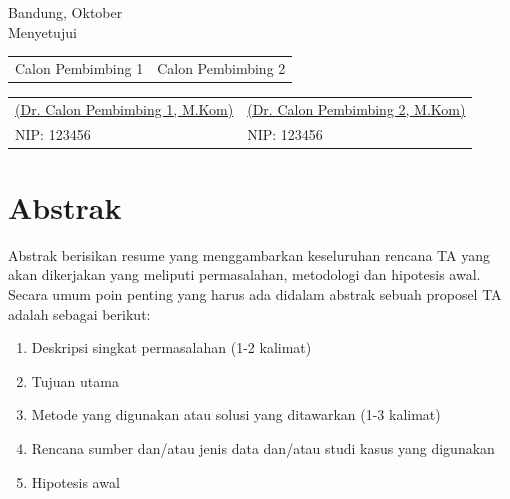 \documentclass[a4paper,12pt,oneside]{book}
\newcommand{\Tanggal}{\the\day} %
\newcommand{\Bulan}{Oktober} %
\newcommand{\PembimbingSatu}{(Dr. Calon Pembimbing 1, M.Kom)}
\newcommand{\NIPPembimbingSatu}{123456}
\newcommand{\PembimbingDua}{(Dr. Calon Pembimbing 2, M.Kom)}
\newcommand{\NIPPembimbingDua}{123456}
\newif\ifPembimbingHanyaSatu
\begin{document}
\begin{titlepage}
{\vspace{0.5cm}

{Bandung, \Tanggal\quad \Bulan \quad \Date}\\
{Menyetujui}\\

\vspace{0.5cm}
      \ifPembimbingHanyaSatu
             \begin{center}
            Calon Pembimbing 1
            \end{center}
       \else
          \begin{center}
              \begin{tabular}{  m{8cm}  m{8cm} }
              Calon Pembimbing 1 & Calon Pembimbing 2
              \end{tabular}
           \end{center}
      \fi
\begin{center}
\vspace{2cm}
\ifPembimbingHanyaSatu
     \underline{\PembimbingSatu} \\ 
      NIP: \NIPPembimbingSatu
\else
\begin{tabular}{  m{8cm}  m{8cm} }
\underline{\PembimbingSatu} & \underline{\PembimbingDua} \\ 
NIP: \NIPPembimbingSatu & NIP: \NIPPembimbingDua
\end{tabular}
\fi
\end{center}
\vspace{0.5cm}

}
\pagebreak
\end{titlepage}
{}
\chapter*{Abstrak}

Abstrak berisikan resume yang menggambarkan keseluruhan rencana TA yang akan dikerjakan yang meliputi permasalahan, metodologi dan hipotesis awal. Secara umum poin penting yang harus ada didalam abstrak sebuah proposel TA adalah sebagai berikut:
\begin{enumerate}
    \item Deskripsi singkat permasalahan (1-2 kalimat)
    \item Tujuan utama
    \item Metode yang digunakan atau solusi yang ditawarkan (1-3 kalimat)
    \item Rencana sumber dan/atau jenis data dan/atau studi kasus yang digunakan
    \item Hipotesis awal
\end{enumerate}
\end{document}
